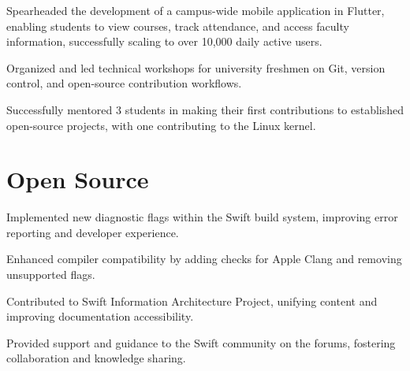 \documentclass{fonts}
\begin{document}
\textbf{\href{https://summerofcode.withgoogle.com/projects/6623823417311232}{}} 
\begin{tightemize}
 \item Spearheaded the development of a campus-wide mobile application in Flutter, enabling students to view courses, track attendance, and access faculty information, successfully scaling to over 10,000 daily active users.
 \item Organized and led technical workshops for university freshmen on Git, version control, and open-source contribution workflows.
 \item Successfully mentored 3 students in making their first contributions to established open-source projects, with one contributing to the Linux kernel.
\end{tightemize}


\section{Open Source}

\textbf{}
\begin{tightemize}
    \item Implemented new diagnostic flags within the Swift build system, improving error reporting and developer experience.
    \item Enhanced compiler compatibility by adding checks for Apple Clang and removing unsupported flags.
    \item Contributed to Swift Information Architecture Project, unifying content and improving documentation accessibility.
    \item Provided support and guidance to the Swift community on the forums, fostering collaboration and knowledge sharing.
\end{tightemize}
\sectionsep


\end{document}
